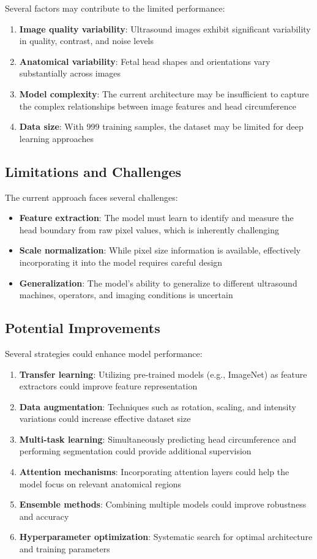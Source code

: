 \documentclass[conference]{IEEEtran}
\begin{document}
Several factors may contribute to the limited performance:
\begin{enumerate}
    \item \textbf{Image quality variability}: Ultrasound images exhibit significant variability in quality, contrast, and noise levels
    \item \textbf{Anatomical variability}: Fetal head shapes and orientations vary substantially across images
    \item \textbf{Model complexity}: The current architecture may be insufficient to capture the complex relationships between image features and head circumference
    \item \textbf{Data size}: With 999 training samples, the dataset may be limited for deep learning approaches
\end{enumerate}

\subsection{Limitations and Challenges}

The current approach faces several challenges:
\begin{itemize}
    \item \textbf{Feature extraction}: The model must learn to identify and measure the head boundary from raw pixel values, which is inherently challenging
    \item \textbf{Scale normalization}: While pixel size information is available, effectively incorporating it into the model requires careful design
    \item \textbf{Generalization}: The model's ability to generalize to different ultrasound machines, operators, and imaging conditions is uncertain
\end{itemize}

\subsection{Potential Improvements}

Several strategies could enhance model performance:
\begin{enumerate}
    \item \textbf{Transfer learning}: Utilizing pre-trained models (e.g., ImageNet) as feature extractors could improve feature representation
    \item \textbf{Data augmentation}: Techniques such as rotation, scaling, and intensity variations could increase effective dataset size
    \item \textbf{Multi-task learning}: Simultaneously predicting head circumference and performing segmentation could provide additional supervision
    \item \textbf{Attention mechanisms}: Incorporating attention layers could help the model focus on relevant anatomical regions
    \item \textbf{Ensemble methods}: Combining multiple models could improve robustness and accuracy
    \item \textbf{Hyperparameter optimization}: Systematic search for optimal architecture and training parameters
\end{enumerate}
\end{document}
